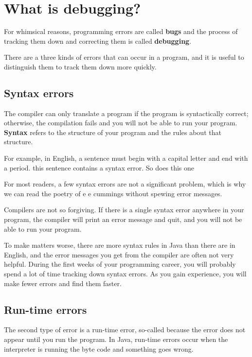 \documentclass[12pt]{book}
\theoremstyle{definition}
\begin{document}
\section{What is debugging?}

For whimsical reasons,
programming errors are called {\bf bugs} and the process
of tracking them down and correcting them is called
{\bf debugging}.

There are a three kinds of errors that can occur
in a program, and it is useful to distinguish them
to track them down more quickly.

\subsection{Syntax errors}

The compiler can only translate a program if the program is
syntactically correct; otherwise, the compilation fails and
you will not be able to run your program.  {\bf Syntax}
refers to the structure of your program and the rules about
that structure.

For example, in English, a sentence must begin with a capital
letter and end with a period.  this sentence contains a syntax
error.  So does this one

For most readers, a few syntax errors are not a significant
problem, which is why we can read the poetry of e e cummings
without spewing error messages.

Compilers are not so forgiving.  If there is a single syntax
error anywhere in your program, the compiler will print an
error message and quit, and you will not be able to run
your program.

To make matters worse, there are more syntax rules in Java
than there are in English, and the error messages you get from
the compiler are often not very helpful.  During the first
weeks of your programming career, you will probably
spend a lot of time tracking down syntax errors.  As you
gain experience, you will make fewer errors and find
them faster.

\subsection{Run-time errors}
\label{run-time}

The second type of error is a run-time error, so-called because
the error does not appear until you run the program.  In Java,
run-time errors occur when the interpreter is running the byte
code and something goes wrong.
\end{document}
